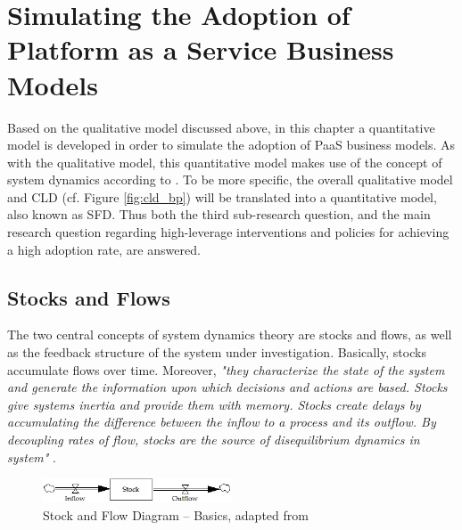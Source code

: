 \chapter{Simulating the Adoption of Platform as a Service Business Models}\label{ch:sfd}

Based on the qualitative model discussed above, in this chapter a quantitative model is developed in order to simulate the adoption of \ac{PaaS} business models. As with the qualitative model, this quantitative model makes use of the concept of system dynamics according to \citet{Sterman2000,Sterman2001}. To be more specific, the overall qualitative model and \ac{CLD} (cf. Figure \ref{fig:cld_bp}) will be translated into a quantitative model, also known as \acf{SFD}. Thus both the third sub-research question, and the main research question regarding high-leverage interventions and policies for achieving a high adoption rate, are answered.

\section{Stocks and Flows}\label{ch:sfd:sf}

The two central concepts of system dynamics theory are stocks and flows, as well as the feedback structure of the system under investigation. Basically, stocks accumulate flows over time. Moreover, \textit{"they characterize the state of the system and generate the information upon which decisions and actions are based. Stocks give systems inertia and provide them with memory. Stocks create delays by accumulating the difference between the inflow to a process and its outflow. By decoupling rates of flow, stocks are the source of disequilibrium dynamics in system"} \citep[p. 192]{Sterman2000}.

\begin{figure}[tb]
	\centering
	\includegraphics[width=0.5\textwidth]{gfx/sfd_basic}
	\caption[Stock and Flow Diagram -- Basics]{Stock and Flow Diagram -- Basics, adapted from \citet[p. 194]{Sterman2000}}
	\label{fig:sfd_b}
\end{figure}

